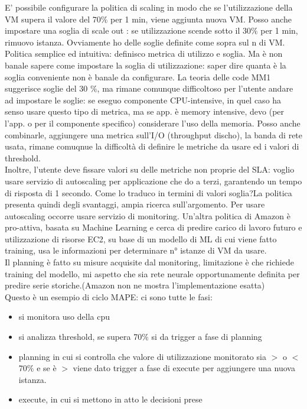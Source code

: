 \documentclass[16px]{article}
\begin{document}
E' possibile configurare la politica di scaling in modo che se l'utilizzazione della VM supera il valore del 70$\%$ per 1 min, viene aggiunta nuova VM. Posso anche impostare una soglia di scale out : se utilizzazione scende sotto il 30$\%$ per 1 min, rimuovo istanza. Ovviamente ho delle soglie definite come sopra sul n di VM.
Politica semplice ed intuitiva: definisco metrica di utilizzo e soglia. Ma è non banale sapere come impostare la soglia di utilizzazione: saper dire quanta è la soglia conveniente non è banale da configurare. La teoria delle code MM1 suggerisce soglie del 30 $\%$, ma rimane comunque difficoltoso per l'utente andare ad impostare le soglie: se eseguo componente CPU-intensive, in quel caso ha senso usare questo tipo di metrica, ma se app. è memory intensive, devo (per l'app. o per il componente specifico) considerare l'uso della memoria. Posso anche combinarle, aggiungere una metrica sull'I/O (throughput discho), la banda di rete usata, rimane comuqnue la difficoltà di definire le metriche da usare ed i valori di threshold.\\
Inoltre, l'utente deve fissare valori su delle metriche non proprie del SLA: voglio usare servizio di autoscaling per applicazione che do a terzi, garantendo un tempo di risposta di 1 secondo. Come lo traduco in termini di valori soglia?La politica presenta quindi degli svantaggi, ampia ricerca sull'argomento.
Per usare autoscaling occorre usare servizio di monitoring.
Un'altra politica di Amazon è pro-attiva, basata su Machine Learning e cerca di predire carico di lavoro futuro e utilizzazione di risorse EC2, su base di un modello di ML di cui viene fatto training, usa le informazioni per determinare n° istanze di VM da usare.\\
Il planning è fatto su misure acquisite dal monitoring, limitazione è che richiede training del modello, mi aspetto che sia rete neurale opportunamente definita per predire serie storiche.(Amazon non ne mostra l'implementazione esatta)\\
Questo è un esempio di ciclo MAPE: ci sono tutte le fasi:
\begin{itemize}
\item si monitora uso della cpu
\item si analizza threshold, se supera 70$\%$ si da trigger a fase di planning
\item planning in cui si controlla che valore di utilizzazione monitorato sia $>$ o $<$ 70$\%$ e se è $>$ viene dato trigger a fase di execute per aggiungere una nuova istanza.
\item execute, in cui si mettono in atto le decisioni prese
\end{itemize}
\end{document}
